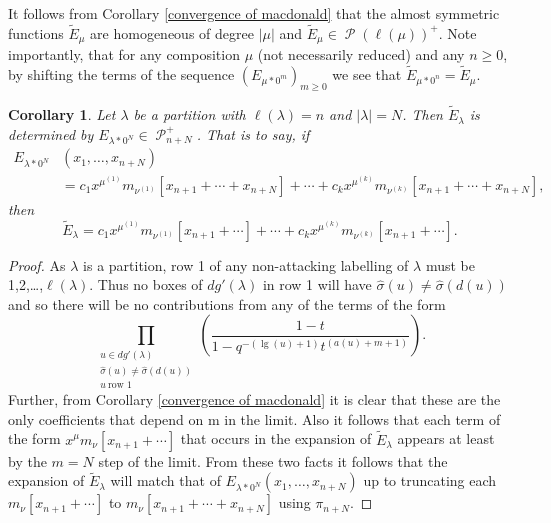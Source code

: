 \documentclass[11pt]{article}
\newtheorem{coro}[theo]{Corollary}
\theoremstyle{definition}
\numberwithin{equation}{section}
\DeclareMathOperator{\sP}{\mathscr{P} }
\DeclareMathOperator{\mathleg}{lg}
\begin{document}
It follows from Corollary \ref{convergence of macdonald} that the almost symmetric functions $\widetilde{E}_{\mu}$ are homogeneous of degree $|\mu|$ and $\widetilde{E}_{\mu} \in \sP(\ell(\mu))^{+}.$ Note importantly, that for any composition $\mu$ (not necessarily reduced) and any $n \geq 0$, by shifting the terms of the sequence $(E_{\mu*0^m})_{m\geq 0}$ we see that $\widetilde{E}_{\mu *0^n} = \widetilde{E}_{\mu}$.



\begin{coro}\label{stabilizing of convergence of macdonald for partitions}
Let $\lambda$ be a partition with $\ell(\lambda) = n$ and $|\lambda| = N$. Then $\widetilde{E}_{\lambda}$ is determined by  $E_{\lambda*0^N} \in \sP_{n+N}^{+}$. That is to say, if 
\begin{align*}
E_{\lambda*0^{N}}&(x_1,\ldots,x_{n+N}) \\ &= c_1 x^{\mu^{(1)}}m_{\nu^{(1)}}[x_{n+1}+\cdots+x_{n+N}] + \cdots + c_k x^{\mu^{(k)}}m_{\nu^{(k)}}[x_{n+1}+ \cdots +x_{n+N}],
\end{align*}
then 
$$ \widetilde{E}_{\lambda} = c_1 x^{\mu^{(1)}}m_{\nu^{(1)}}[x_{n+1}+ \cdots] + \cdots + c_k x^{\mu^{(k)}}m_{\nu^{(k)}}[x_{n+1}+ \cdots] .$$
\end{coro}

\begin{proof}
As $\lambda$ is a partition, row 1 of any non-attacking labelling of $\lambda$ must be 1,2,\ldots,$\ell(\lambda)$. Thus no boxes of $dg'(\lambda)$ in row 1 will have $\widehat{\sigma}(u) \neq \widehat{\sigma}(d(u))$ and so there will be no contributions from any of the terms of the form 
$$\prod_{\substack{ u \in dg'(\lambda) \\ \widehat{\sigma}(u) \neq \widehat{\sigma}(d(u)) \\ u ~ \text{row } 1 }} \left( \frac{1-t}{1-q^{-(\mathleg(u) +1)}t^{(a(u) + m + 1)}} \right).$$ Further, from  Corollary \ref{convergence of macdonald} it is clear that these are the only coefficients that depend on m in the limit. Also it follows that each term of the form $x^{\mu}m_{\nu}[x_{n+1}+ \cdots]$ that occurs in the expansion of $\widetilde{E}_{\lambda}$ appears at least by the $m = N$ step of the limit. From these two facts it follows that the expansion of $\widetilde{E}_{\lambda}$ will match that of $E_{\lambda*0^{N}}(x_1,\ldots,x_{n+N})$ up to truncating each $m_{\nu}[x_{n+1}+ \cdots]$ to $m_{\nu}[x_{n+1}+\cdots + x_{n+N}]$ using $\pi_{n+N}.$
\end{proof}
\end{document}
